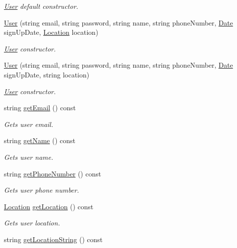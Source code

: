 \begin{DoxyCompactItemize}
\begin{DoxyCompactList}\small\item\em \hyperlink{class_user}{User} default constructor. \end{DoxyCompactList}\item 
\hyperlink{class_user_a670870b549b3675f2ebcc7045f89cd1f}{User} (string email, string password, string name, string phone\+Number, \hyperlink{class_date}{Date} sign\+Up\+Date, \hyperlink{class_location}{Location} location)
\begin{DoxyCompactList}\small\item\em \hyperlink{class_user}{User} constructor. \end{DoxyCompactList}\item 
\hyperlink{class_user_a55fbba82f16e683eba80f23d09d49e06}{User} (string email, string password, string name, string phone\+Number, \hyperlink{class_date}{Date} sign\+Up\+Date, string location)
\begin{DoxyCompactList}\small\item\em \hyperlink{class_user}{User} constructor. \end{DoxyCompactList}\item 
string \hyperlink{class_user_ac8a15550f3596a7ef13eb31b82a8ecf6}{get\+Email} () const 
\begin{DoxyCompactList}\small\item\em Gets user email. \end{DoxyCompactList}\item 
string \hyperlink{class_user_a2b2a3d00d303affb4f5674bc9788db52}{get\+Name} () const 
\begin{DoxyCompactList}\small\item\em Gets user name. \end{DoxyCompactList}\item 
string \hyperlink{class_user_a4d59412a7d7411dd8c8127adc9e80fae}{get\+Phone\+Number} () const 
\begin{DoxyCompactList}\small\item\em Gets user phone number. \end{DoxyCompactList}\item 
\hyperlink{class_location}{Location} \hyperlink{class_user_a7c2072cbf540ae1bd47992b40783843c}{get\+Location} () const 
\begin{DoxyCompactList}\small\item\em Gets user location. \end{DoxyCompactList}\item 
string \hyperlink{class_user_a7185d303044e8dbb683b717228e2560d}{get\+Location\+String} () const 

\end{DoxyCompactItemize}

